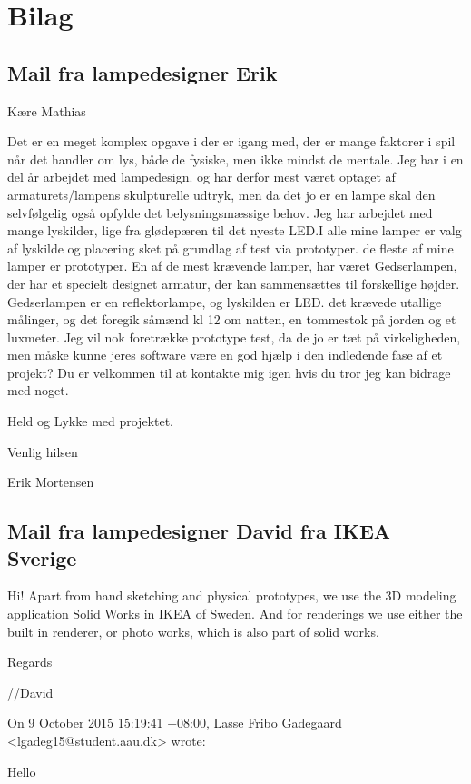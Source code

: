 \section{Bilag}


\subsection{Mail fra lampedesigner Erik}
\label{sec:mailErik}
Kære Mathias

Det er en meget komplex opgave i der er igang med, der er mange faktorer i spil når det handler om lys, både de fysiske, men ikke mindst de mentale. Jeg har i en del år arbejdet med lampedesign. og har derfor mest været optaget af armaturets/lampens skulpturelle udtryk, men da det jo er en lampe skal den selvfølgelig  også opfylde det belysningsmæssige behov. Jeg har arbejdet med mange lyskilder, lige fra glødepæren til det nyeste LED.I alle mine lamper er valg af lyskilde og placering sket på grundlag af test via prototyper. de fleste af mine lamper er prototyper. En af de mest krævende lamper, har været Gedserlampen, der har et specielt designet armatur, der kan sammensættes til forskellige højder. Gedserlampen er en reflektorlampe, og lyskilden er LED. det krævede utallige målinger, og det foregik såmænd kl 12 om natten, en tommestok på jorden og et luxmeter. Jeg vil nok foretrække prototype test, da de jo er tæt på virkeligheden, men måske kunne jeres software være en god hjælp i den indledende fase af et projekt? Du er velkommen til at kontakte mig igen hvis du tror jeg kan bidrage med noget.

Held og Lykke med projektet.

Venlig hilsen

Erik Mortensen

\subsection{Mail fra lampedesigner David fra IKEA Sverige}
\label{sec:mailDavid}
Hi! Apart from hand sketching and physical prototypes, we use the 3D modeling application Solid Works in IKEA of Sweden. And for renderings we use either the built in renderer, or photo works, which is also part of solid works.

Regards 

//David 

  On 9 October 2015 15:19:41 +08:00, Lasse Fribo Gadegaard <lgadeg15@student.aau.dk> wrote:
   
  Hello
   
